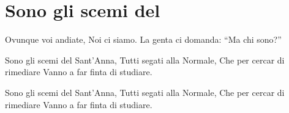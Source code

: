 \section{Sono gli scemi del \santanna}
\subtitle{Il primo verso capocoro e poi tutti, il secondo tutti assieme}
\begin{canzone}
Ovunque voi andiate,
Noi ci siamo.
La genta ci domanda:
“Ma chi sono?”

Sono gli scemi del Sant’Anna,
Tutti segati alla Normale,
Che per cercar di rimediare
Vanno a far finta di studiare.

Sono gli scemi del Sant’Anna,
Tutti segati alla Normale,
Che per cercar di rimediare
Vanno a far finta di studiare.
\end{canzone}
